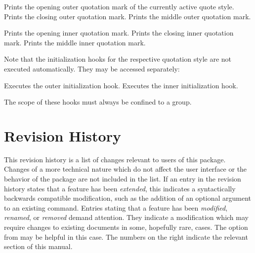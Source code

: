 \documentclass{ltxdockit}[2010/09/26]
\begin{document}
\begin{ltxsyntax}

 Prints the opening outer quotation mark of the currently active quote style.
 Prints the closing outer quotation mark.
 Prints the middle outer quotation mark.

 Prints the opening inner quotation mark.
 Prints the closing inner quotation mark.
 Prints the middle inner quotation mark.

\end{ltxsyntax}

Note that the initialization hooks for the respective quotation style are not executed automatically. They may be accessed separately:

\begin{ltxsyntax}

 Executes the outer initialization hook.
 Executes the inner initialization hook.

\end{ltxsyntax}

The scope of these hooks must always be confined to a group.

\section{Revision History}

This revision history is a list of changes relevant to users of this package. Changes of a more technical nature which do not affect the user interface or the behavior of the package are not included in the list. If an entry in the revision history states that a feature has been \emph{extended}, this indicates a syntactically backwards compatible modification, such as the addition of an optional argument to an existing command. Entries stating that a feature has been \emph{modified}, \emph{renamed}, or \emph{removed} demand attention. They indicate a modification which may require changes to existing documents in some, hopefully rare, cases. The  option from  may be helpful in this case. The numbers on the right indicate the relevant section of this manual.
\end{document}
